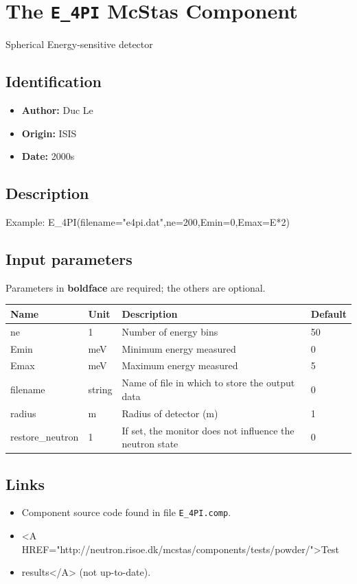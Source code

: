 \section{The \texttt{E\_4PI} McStas Component}
Spherical Energy-sensitive detector

\subsection*{Identification}
\begin{itemize}
  \item \textbf{Author:} Duc Le
  \item \textbf{Origin:} ISIS
  \item \textbf{Date:} 2000s
\end{itemize}

\subsection*{Description}
Example: E\_4PI(filename="e4pi.dat",ne=200,Emin=0,Emax=E*2)

\subsection*{Input parameters}
Parameters in \textbf{boldface} are required; the others are optional.

\begin{longtable}{p{}p{}p{}p{}}
\toprule
\textbf{Name} & \textbf{Unit} & \textbf{Description} & \textbf{Default} \\
\midrule
\endhead
ne & 1 & Number of energy bins & 50 \\
Emin & meV & Minimum energy measured & 0 \\
Emax & meV & Maximum energy measured & 5 \\
filename & string & Name of file in which to store the output data & 0 \\
radius & m & Radius of detector (m) & 1 \\
restore\_neutron & 1 & If set, the monitor does not influence the neutron state & 0 \\
\bottomrule
\end{longtable}

\subsection*{Links}
\begin{itemize}
  \item Component source code found in file \texttt{E\_4PI.comp}.
  \item \textless{}A HREF="http://neutron.risoe.dk/mcstas/components/tests/powder/"\textgreater{}Test
  \item results\textless{}/A\textgreater{} (not up-to-date).
\end{itemize}
